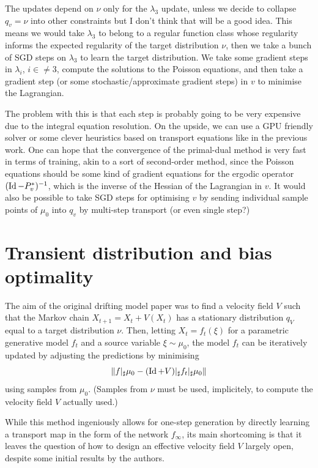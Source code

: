 \documentclass[twoside,10pt]{../jmlr}
\begin{document}
The updates depend on $\nu$ only for the $\lambda_3$ update, unless we decide to collapse $q_v=\nu$ into other constraints but I don't think that will be a good idea. This means we would take $\lambda_3$ to belong to a regular function class whose regularity informs the expected regularity of the target distribution $\nu$, then we take a bunch of SGD steps on $\lambda_3$ to learn the target distribution. We take some gradient steps in $\lambda_i$, $i\in\neq 3$, compute the solutions to the Poisson equations, and then take a gradient step (or some stochastic/approximate gradient steps) in $v$ to minimise the Lagrangian.

The problem with this is that each step is probably going to be very expensive due to the integral equation resolution. On the upside, we can use a GPU friendly solver or some clever heuristics based on transport equations like in the previous work. One can hope that the convergence of the primal-dual method is very fast in terms of training, akin to a sort of second-order method, since the Poisson equations should be some kind of gradient equations for the ergodic operator $(\operatorname{Id}-P^*_v)^{-1}$, which is the inverse of the Hessian of the Lagrangian in $v$. It would also be possible to take SGD steps for optimising $v$ by sending individual sample points of $\mu_0$ into $q_v$ by multi-step transport (or even single step?)


\section{Transient distribution and bias optimality}

The aim of the original drifting model paper \cite{deng2026generative} was to find a velocity field $V$ such that the Markov chain $X_{t+1}=X_t+V(X_t)$ has a stationary distribution $q_V$ equal to a target distribution $\nu$. Then, letting $X_t=f_t(\xi)$ for a parametric generative model $f_t$ and a source variable $\xi\sim\mu_0$, the model $f_t$ can be iteratively updated by adjusting the predictions by minimising \[\left\lVert f\vert_\sharp\mu_0 - (\operatorname{Id} + V)\vert_\sharp f_t\vert_\sharp\mu_0\right\rVert \]
using samples from $\mu_0$. (Samples from $\nu$ must be used, implicitely, to compute the velocity field $V$ actually used.)

While this method ingeniously allows for one-step generation by directly learning a transport map in the form of the network $f_\infty$, its main shortcoming is that it leaves the question of how to design an effective velocity field $V$ largely open, despite some initial results by the authors. 
\end{document}
